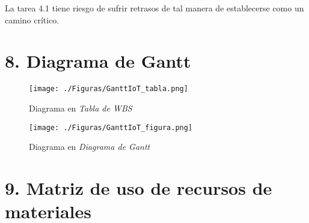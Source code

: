 \documentclass[11pt]{charter}
\begin{document}
La tarea 4.1 tiene riesgo de sufrir retrasos de tal manera de establecerse como un camino crítico. 

\section{8. Diagrama de Gantt}
\label{sec:gantt}

\begin{figure}[htpb]
\centering 
\texttt{[image: ./Figuras/GanttIoT\_tabla.png]}
\caption{Diagrama en \textit{Tabla de WBS}}
\label{fig:AoN}
\end{figure}

\begin{figure}[htpb]
\centering 
\texttt{[image: ./Figuras/GanttIoT\_figura.png]}
\caption{Diagrama en \textit{Diagrama de Gantt}}
\label{fig:AoN}
\end{figure}


\section{9. Matriz de uso de recursos de materiales}
\label{sec:recursos}
\end{document}
